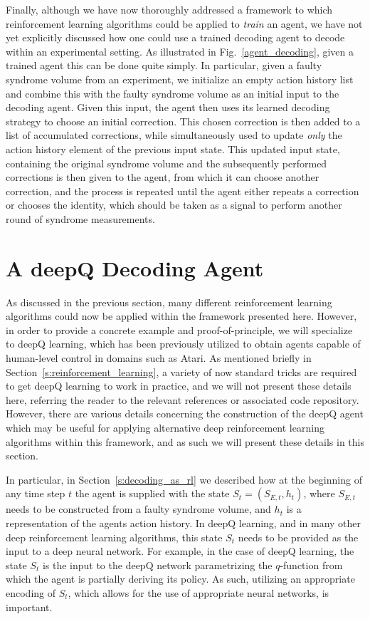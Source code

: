 \documentclass[twocolumn,preprintnumbers,amsmath,amssymb,notitlepage,nofootinbib,longbibliography,superscriptaddress,aps,pra,10pt]{revtex4-1}
\begin{document}
	Finally, although we have now thoroughly addressed a framework to which reinforcement learning algorithms could be applied to \textit{train} an agent, we have not yet explicitly discussed how one could use a trained decoding agent to decode within an experimental setting.
	As illustrated in Fig.~\ref{agent_decoding}, given a trained agent this can be done quite simply.
	In particular, given a faulty syndrome volume from an experiment, we initialize an empty action history list and combine this with the faulty syndrome volume as an initial input to the decoding agent.
	Given this input, the agent then uses its learned decoding strategy to choose an initial correction.
	This chosen correction is then added to a list of accumulated corrections, while simultaneously used to update \textit{only} the action history element of the previous input state.
	This updated input state, containing the original syndrome volume and the subsequently performed corrections is then given to the agent, from which it can choose another correction, and the process is repeated until the agent either repeats a correction or chooses the identity, which should be taken as a signal to perform another round of syndrome measurements.

\section{A deepQ Decoding Agent}\label{s:dq_agent}

	As discussed in the previous section, many different reinforcement learning algorithms could now be applied within the framework presented here.
	However, in order to provide a concrete example and proof-of-principle, we will specialize to deepQ learning, which has been previously utilized to obtain agents capable of human-level control in domains such as Atari.
	As mentioned briefly in Section~\ref{s:reinforcement_learning}, a variety of now standard tricks are required to get deepQ learning to work in practice, and we will not present these details here, referring the reader to the relevant references or associated code repository.
	However, there are various details concerning the construction of the deepQ agent which may be useful for applying alternative deep reinforcement learning algorithms within this framework, and as such we will present these details in this section.

	In particular, in Section~\ref{s:decoding_as_rl} we described how at the beginning of any time step $t$ the agent is supplied with the state $S_{t}=(S_{E,{t}},h_{t})$, where $S_{E,{t}}$ needs to be constructed from a faulty syndrome volume, and $h_{t}$ is a representation of the agents action history.
	In deepQ learning, and in many other deep reinforcement learning algorithms, this state $S_t$ needs to be provided as the input to a deep neural network.
	For example, in the case of deepQ learning, the state $S_t$ is the input to the deepQ network parametrizing the $q$-function from which the agent is partially deriving its policy.
	As such, utilizing an appropriate encoding of $S_t$, which allows for the use of appropriate neural networks, is important.
\end{document}
